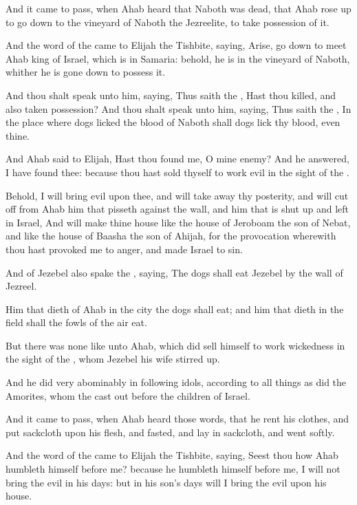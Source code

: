 \verse And it came to pass, when Ahab heard that Naboth was dead, that Ahab rose up to go down to the vineyard of Naboth the Jezreelite, to take possession of it.

\verse And the word of the \LORD came to Elijah the Tishbite, saying, \verse Arise, go down to meet Ahab king of Israel, which is in Samaria: behold, he is in the vineyard of Naboth, whither he is gone down to possess it.

\verse And thou shalt speak unto him, saying, Thus saith the \LORD, Hast thou killed, and also taken possession? And thou shalt speak unto him, saying, Thus saith the \LORD, In the place where dogs licked the blood of Naboth shall dogs lick thy blood, even thine.

\verse And Ahab said to Elijah, Hast thou found me, O mine enemy? And he answered, I have found thee: because thou hast sold thyself to work evil in the sight of the \LORD.

\verse Behold, I will bring evil upon thee, and will take away thy posterity, and will cut off from Ahab him that pisseth against the wall, and him that is shut up and left in Israel, \verse And will make thine house like the house of Jeroboam the son of Nebat, and like the house of Baasha the son of Ahijah, for the provocation wherewith thou hast provoked me to anger, and made Israel to sin.

\verse And of Jezebel also spake the \LORD, saying, The dogs shall eat Jezebel by the wall of Jezreel.

\verse Him that dieth of Ahab in the city the dogs shall eat; and him that dieth in the field shall the fowls of the air eat.

\verse But there was none like unto Ahab, which did sell himself to work wickedness in the sight of the \LORD, whom Jezebel his wife stirred up.

\verse And he did very abominably in following idols, according to all things as did the Amorites, whom the \LORD cast out before the children of Israel.

\verse And it came to pass, when Ahab heard those words, that he rent his clothes, and put sackcloth upon his flesh, and fasted, and lay in sackcloth, and went softly.

\verse And the word of the \LORD came to Elijah the Tishbite, saying, \verse Seest thou how Ahab humbleth himself before me? because he humbleth himself before me, I will not bring the evil in his days: but in his son's days will I bring the evil upon his house.


